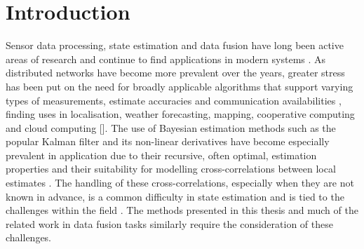 
\chapter{Introduction}\label{ch:intro}
Sensor data processing, state estimation and data fusion have long been active areas of research and continue to find applications in modern systems \cite{andersonOptimalFiltering1979,simonOptimalStateEstimation2006}. As distributed networks have become more prevalent over the years, greater stress has been put on the need for broadly applicable algorithms that support varying types of measurements, estimate accuracies and communication availabilities \cite{mutambaraDecentralizedEstimationControl1998,ligginsDistributedDataFusion2012}, finding uses in localisation, weather forecasting, mapping, cooperative computing and cloud computing []. The use of Bayesian estimation methods such as the popular Kalman filter and its non-linear derivatives have become especially prevalent in application due to their recursive, often optimal, estimation properties and their suitability for modelling cross-correlations between local estimates \cite{chongFortyYearsDistributed2017,haugBayesianEstimationTracking2012}. The handling of these cross-correlations, especially when they are not known in advance, is a common difficulty in state estimation and is tied to the challenges within the field \cite{noackTreatmentDependentInformation2017}. The methods presented in this thesis and much of the related work in data fusion tasks similarly require the consideration of these challenges.

